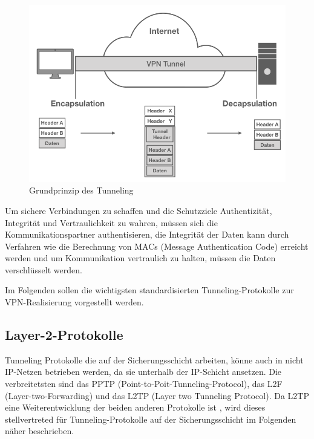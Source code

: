 \begin{figure}[h]
	\includegraphics[width=\linewidth]{tunneling}
	\caption{Grundprinzip des Tunneling}
	\label{tunnel}
\end{figure}

Um sichere Verbindungen zu schaffen und die Schutzziele Authentizität, Integrität und Vertraulichkeit zu wahren, müssen sich die Kommunikationspartner authentisieren, die Integrität der Daten kann durch Verfahren wie die Berechnung von MACs (Message Authentication Code) erreicht werden und um Kommunikation vertraulich zu halten, müssen die Daten verschlüsselt werden.  

 Im Folgenden sollen die wichtigsten standardisierten  Tunneling-Protokolle zur VPN-Realisierung vorgestellt werden.
 

\subsection{Layer-2-Protokolle}
Tunneling Protokolle die auf der Sicherungsschicht arbeiten, könne auch in nicht IP-Netzen betrieben werden, da sie unterhalb der IP-Schicht ansetzen. Die verbreitetsten sind das PPTP (Point-to-Poit-Tunneling-Protocol), das L2F  (Layer-two-Forwarding) und das L2TP (Layer two Tunneling Protocol). Da L2TP eine Weiterentwicklung der beiden anderen Protokolle ist \cite{lipp2007vpn}, wird dieses stellvertreted für Tunneling-Protokolle auf der Sicherungsschicht im Folgenden näher beschrieben.


